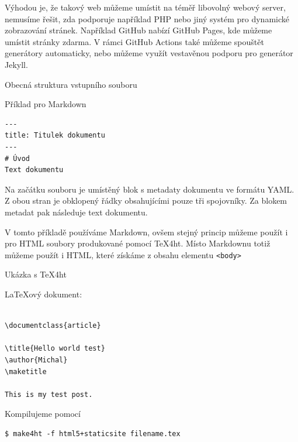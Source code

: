 Výhodou je, že takový web můžeme umístit na téměř libovolný webový server,
nemusíme řešit, zda podporuje například PHP nebo jiný systém pro dynamické 
zobrazování stránek. Například GitHub nabízí GitHub Pages, kde můžeme 
umístit stránky zdarma. V rámci GitHub Actions také můžeme spouštět generátory
automaticky, nebo můžeme využít vestavěnou podporu pro generátor Jekyll.


\begin{frame}[fragile]{Obecná struktura vstupního souboru}

\begin{block}{Příklad pro Markdown}
\begin{verbatim}
---
title: Titulek dokumentu
---
# Úvod
Text dokumentu
\end{verbatim}
\end{block}

\end{frame}

Na začátku souboru je umístěný blok s metadaty dokumentu ve formátu YAML. Z obou stran
je obklopený řádky obsahujícími pouze tři spojovníky. Za blokem metadat pak následuje 
text dokumentu.

V tomto příkladě používáme Markdown, ovšem stejný princip 
můžeme použít i pro HTML soubory produkované pomocí \TeX4ht.
Místo Markdownu totiž můžeme použít i HTML, které získáme z obsahu elementu 
\verb|<body>|

\begin{frame}[fragile]{Ukázka s \TeX4ht}
\begin{block}{\LaTeX ový dokument:}
\begin{verbatim}

\documentclass{article}

\title{Hello world test}
\author{Michal}
\maketitle

This is my test post.

\end{verbatim}
\end{block}

\begin{block}{Kompilujeme pomocí}
\begin{verbatim}
$ make4ht -f html5+staticsite filename.tex
\end{verbatim}
\end{block}
\end{frame}

